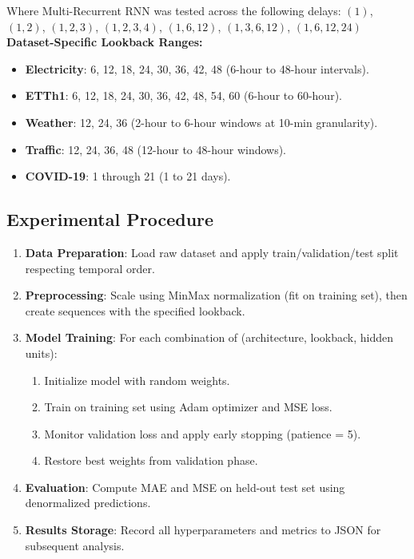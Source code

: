\documentclass[conference]{IEEEtran}
\begin{document}
Where Multi-Recurrent RNN was tested across the following delays:
$(1)$, $(1,2)$, $(1,2,3)$, $(1,2,3,4)$,
$(1,6,12)$, $(1,3,6,12)$, $(1,6,12,24)$ 
\\
\textbf{Dataset-Specific Lookback Ranges:}

\begin{itemize}
    \item \textbf{Electricity}: 6, 12, 18, 24, 30, 36, 42, 48 (6-hour to 48-hour intervals).
    
    \item \textbf{ETTh1}: 6, 12, 18, 24, 30, 36, 42, 48, 54, 60 (6-hour to 60-hour).
    
    \item \textbf{Weather}: 12, 24, 36 (2-hour to 6-hour windows at 10-min granularity).
    
    \item \textbf{Traffic}: 12, 24, 36, 48 (12-hour to 48-hour windows).
    
    \item \textbf{COVID-19}: 1 through 21 (1 to 21 days).
\end{itemize}

\subsection{Experimental Procedure}

\begin{enumerate}
    \item \textbf{Data Preparation}: Load raw dataset and apply
    train/validation/test split respecting temporal order.
    
    \item \textbf{Preprocessing}: Scale using MinMax normalization
    (fit on training set), then create sequences with the specified
    lookback.
    
    \item \textbf{Model Training}: For each combination of
    (architecture, lookback, hidden units):
    \begin{enumerate}
        \item Initialize model with random weights.
        \item Train on training set using Adam optimizer and MSE
        loss.
        \item Monitor validation loss and apply early stopping
        (patience = 5).
        \item Restore best weights from validation phase.
    \end{enumerate}
    
    \item \textbf{Evaluation}: Compute MAE and MSE on held-out test
    set using denormalized predictions.
    
    \item \textbf{Results Storage}: Record all hyperparameters and
    metrics to JSON for subsequent analysis.
\end{enumerate}
\end{document}
